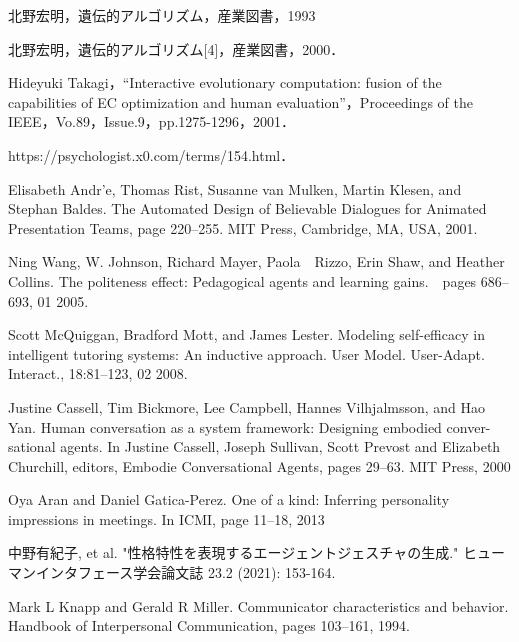 \renewcommand{\bibname}{参考文献}

\begin{thebibliography}{27} %




北野宏明，遺伝的アルゴリズム，産業図書，1993


北野宏明，遺伝的アルゴリズム[4]，産業図書，2000．


Hideyuki Takagi，“Interactive evolutionary computation: fusion of the capabilities of EC optimization and human evaluation”，Proceedings of the IEEE，Vo.89，Issue.9，pp.1275-1296，2001．

https://psychologist.x0.com/terms/154.html．

Elisabeth Andr'e, Thomas Rist, Susanne van Mulken, Martin Klesen, and Stephan Baldes. The Automated Design of Believable Dialogues for Animated Presentation Teams, page 220–255. MIT Press, Cambridge, MA, USA, 2001.

Ning Wang, W. Johnson, Richard Mayer, Paola　Rizzo, Erin Shaw, and Heather Collins. The politeness effect: Pedagogical agents and learning gains.　pages 686–693, 01 2005.


Scott McQuiggan, Bradford Mott, and James Lester. Modeling self-efficacy in intelligent tutoring systems: An inductive approach. User Model. User-Adapt. Interact., 18:81–123, 02 2008.

Justine Cassell, Tim Bickmore, Lee Campbell, Hannes Vilhjalmsson, and Hao Yan. Human conversation as a system framework: Designing embodied conver- sational agents. In Justine Cassell, Joseph Sullivan, Scott Prevost and Elizabeth Churchill, editors, Embodie Conversational Agents, pages 29–63. MIT Press, 2000

Oya Aran and Daniel Gatica-Perez. One of a kind: Inferring personality impressions in meetings. In ICMI, page 11–18, 2013


中野有紀子, et al. "性格特性を表現するエージェントジェスチャの生成." ヒューマンインタフェース学会論文誌 23.2 (2021): 153-164.


Mark L Knapp and Gerald R Miller. Communicator characteristics and behavior. Handbook of Interpersonal Communication, pages 103–161, 1994.



\end{thebibliography}
